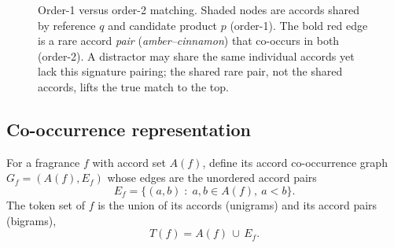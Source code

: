 \documentclass[conference]{IEEEtran}
\begin{document}
\begin{figure}[t]
\centering
{}
\caption{Order-1 versus order-2 matching. Shaded nodes are accords shared by reference $q$
and candidate product $p$ (order-1). The bold red edge is a rare accord \emph{pair}
(\textit{amber--cinnamon}) that co-occurs in both (order-2). A distractor may share the same
individual accords yet lack this signature pairing; the shared rare pair, not the shared
accords, lifts the true match to the top.}
\label{fig:concept}
\end{figure}

\subsection{Co-occurrence representation}
For a fragrance $f$ with accord set $A(f)$, define its accord co-occurrence graph
$G_f=(A(f),E_f)$ whose edges are the unordered accord pairs
\begin{equation}
E_f=\{(a,b)\;:\;a,b\in A(f),\ a<b\}. \label{eq:edges}
\end{equation}
The token set of $f$ is the union of its accords (unigrams) and its accord pairs
(bigrams),
\begin{equation}
T(f)=A(f)\,\cup\,E_f. \label{eq:tokens}
\end{equation}
\end{document}
